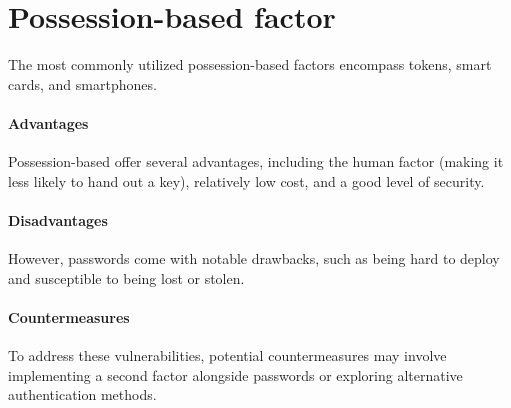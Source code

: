 \section{Possession-based factor}

The most commonly utilized possession-based factors encompass tokens, smart cards, and smartphones.

\paragraph*{Advantages}
Possession-based offer several advantages, including the human factor (making it less likely to hand out a key), relatively low cost, and a good level of security.

\paragraph*{Disadvantages}
However, passwords come with notable drawbacks, such as being hard to deploy and susceptible to being lost or stolen.

\paragraph*{Countermeasures}
To address these vulnerabilities, potential countermeasures may involve implementing a second factor alongside passwords or exploring alternative authentication methods.

